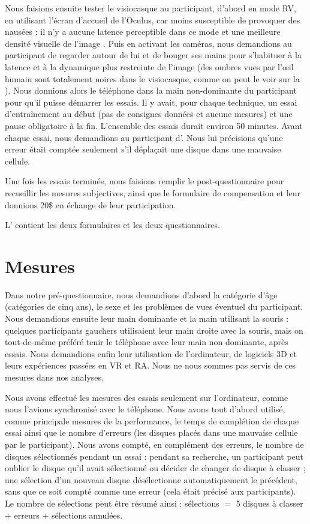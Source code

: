 Nous faisions ensuite tester le visiocasque au participant, d'abord en mode RV, en utilisant l'écran d'accueil de l'Oculus, car moins susceptible de provoquer des nausées : il n'y a aucune latence perceptible dans ce mode et une meilleure densité visuelle de l'image . Puis en activant les caméras, nous demandions au participant de regarder autour de lui et de bouger ses mains pour s'habituer à la latence et à la dynamique plus restreinte de l'image (des ombres vues par l'\oe il humain sont totalement noires dans le visiocasque, comme on peut le voir sur la ). Nous donnions alors le téléphone dans la main non-dominante du participant pour qu'il puisse démarrer les essais. Il y avait, pour chaque technique, un essai d'entraînement au début (pas de consignes données et aucune mesures) et une pause obligatoire à la fin. L'ensemble des essais durait environ 50 minutes. Avant chaque essai, nous demandions au participant d'. Nous lui précisions qu'une erreur était comptée seulement s'il déplaçait une disque dans une mauvaise cellule.

Une fois les essais terminés, nous faisions remplir le post-questionnaire pour recueillir les mesures subjectives, ainsi que le formulaire de compensation et leur donnions 20\$ en échange de leur participation.

L' contient les deux formulaires et les deux questionnaires.


\section{Mesures}
\label{sec:experiment_measures}

Dans notre pré-questionnaire, nous demandions d'abord la catégorie d'âge (catégories de cinq ans), le sexe et les problèmes de vues éventuel du participant. Nous demandions ensuite leur main dominante et la main utilisant la souris : quelques participants gauchers utilisaient leur main droite avec la souris, mais on tout-de-même préféré tenir le téléphone avec leur main non dominante, après essais. Nous demandions enfin leur utilisation de l'ordinateur, de logiciels 3D et leurs expériences passées en VR et RA. Nous ne nous sommes pas servis de ces mesures dans nos analyses.

Nous avons effectué les mesures des essais seulement sur l'ordinateur, comme nous l'avions synchronisé avec le téléphone. Nous avons tout d'abord utilisé, comme principale mesures de la performance, le temps de complétion de chaque essai ainsi que le nombre d'erreurs (les disques placés dans une mauvaise cellule par le participant). Nous avons compté, en complément des erreurs, le nombre de disques sélectionnés pendant un essai : pendant sa recherche, un participant peut oublier le disque qu'il avait sélectionné ou décider de changer de disque à classer ; une sélection d'un nouveau disque désélectionne automatiquement le précédent, sans que ce soit compté comme une erreur (cela était précisé aux participants). Le nombre de sélections peut être résumé ainsi : sélections $=$ 5 disques à classer $+$ erreurs $+$ sélections annulées.

